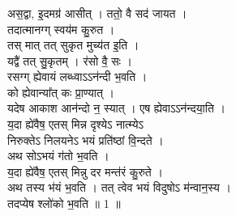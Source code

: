 \subsubsection{}
अस॒द्वा, इ॒दमग्र॑ आसीत् । ततो॒ वै सद॑ जायत ।\\
तदात्मानग्ग् स्वय॑म कु॒रुत । \\
तस् मात् तत् सुकृत मुच्य॑त इ॒ति ।\\
यद्वै॑ तत् सु॒कृतम् । र॑सो वै॒ सः ।\\
रसग्ग् ह्येवायं लब्ध्वाऽऽन॑न्दी भ॒वति । \\
को ह्येवान्या᳚त् कः प्रा॒ण्यात् । \\
यदेष आकाश आन॑न्दो न॒ स्यात् । एष ह्येवाऽऽन॑न्दया॒ति ।\\
य॒दा ह्ये॑वैष॒ एतस् मिन्न दृश्येऽ नात्म्येऽ\\
निरुक्तेऽ निलयनेऽ भयं प्रति॑ष्ठां वि॒न्दते । \\
अथ सोऽभयं ग॑तो भ॒वति ।\\
य॒दा ह्ये॑वैष॒ एतस् मिन्नु दर मन्त॑रं कु॒रुते ।\\
अथ तस्य भ॑यं भ॒वति । तत् त्वेव भयं विदुषोऽ म॑न्वान॒स्य ।\\
तदप्येष श्लो॑को भ॒वति ॥ 1 ॥\\
